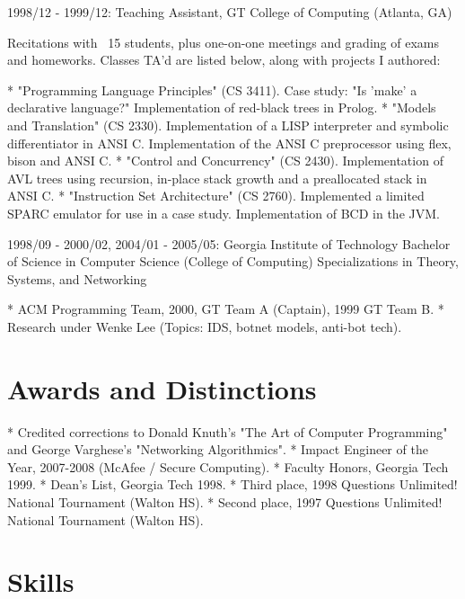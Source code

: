 \documentclass{article}
\begin{document}
1998/12 - 1999/12: Teaching Assistant, GT College of Computing (Atlanta, GA)

Recitations with ~15 students, plus one-on-one meetings and grading of exams
and homeworks. Classes TA'd are listed below, along with projects I authored:

* "Programming Language Principles" (CS 3411). Case study: "Is 'make' a
   declarative language?" Implementation of red-black trees in Prolog.
* "Models and Translation" (CS 2330). Implementation of a LISP interpreter
   and symbolic differentiator in ANSI C. Implementation of the ANSI C
   preprocessor using flex, bison and ANSI C.
* "Control and Concurrency" (CS 2430). Implementation of AVL trees using
   recursion, in-place stack growth and a preallocated stack in ANSI C.
* "Instruction Set Architecture" (CS 2760). Implemented a limited SPARC
   emulator for use in a case study. Implementation of BCD in the JVM.

1998/09 - 2000/02, 2004/01 - 2005/05: Georgia Institute of Technology
Bachelor of Science in Computer Science (College of Computing)
Specializations in Theory, Systems, and Networking

* ACM Programming Team, 2000, GT Team A (Captain), 1999 GT Team B.
* Research under Wenke Lee (Topics: IDS, botnet models, anti-bot tech).

\section{Awards and Distinctions}

* Credited corrections to Donald Knuth's "The Art of Computer Programming"
   and George Varghese's "Networking Algorithmics".
* Impact Engineer of the Year, 2007-2008 (McAfee / Secure Computing).
* Faculty Honors, Georgia Tech 1999.
* Dean's List, Georgia Tech 1998.
* Third place, 1998 Questions Unlimited! National Tournament (Walton HS).
* Second place, 1997 Questions Unlimited! National Tournament (Walton HS).

\section{Skills}
\end{document}
